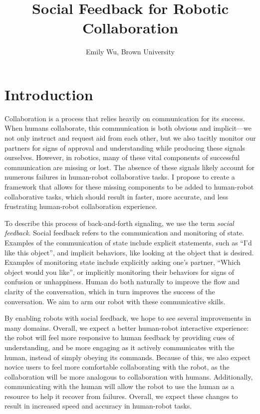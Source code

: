 \documentclass{article}
\title{Social Feedback for Robotic Collaboration}
\author{Emily Wu, Brown University}
\begin{document}
\maketitle

\section{Introduction}

Collaboration is a process that relies heavily on communication for its success. When humans collaborate, this communication is both obvious and implicit---we not only instruct and request aid from each other, but we also tacitly monitor our partners for signs of approval and understanding while producing these signals ourselves. However, in robotics, many of these vital components of successful communication are missing or lost. The absence of these signals likely account for numerous failures in human-robot collaborative tasks. I propose to create a framework that allows for these missing components to be added to human-robot collaborative tasks, which should result in faster, more accurate, and less frustrating human-robot collaboration experience. 

To describe this process of back-and-forth signaling, we use the term \emph{social feedback}. Social feedback refers to the communication and monitoring of state. Examples of the communication of state include explicit statements, such as ``I'd like this object'', and implicit behaviors, like looking at the object that is desired. Examples of monitoring state include explicitly asking one's partner, ``Which object would you like'', or implicitly monitoring their behaviors for signs of confusion or unhappiness. Human do both naturally to improve the flow and clarity of the conversation, which in turn improves the success of the conversation. We aim to arm our robot with these communicative skills. 

By enabling robots with social feedback, we hope to see several improvements in many domains. Overall, we expect a better human-robot interactive experience: the robot will feel more responsive to human feedback by providing cues of understanding, and be more engaging as it actively communicates with the human, instead of simply obeying its commands. Because of this, we also expect novice users to feel more comfortable collaborating with the robot, as the collaboration will be more analogous to collaboration with humans. Additionally, communicating with the human will allow the robot to use the human as a resource to help it recover from failures. Overall, we expect these changes to result in increased speed and accuracy in human-robot tasks. 
\end{document}
